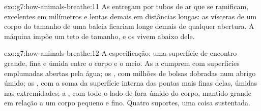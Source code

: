 \begin{solution}{exo:g7:how-animals-breathe:11}
As  entregam por tubos de ar que se ramificam, excelentes em
milímetros e lentas demais em distâncias longas: as vísceras de um
corpo do tamanho de uma baleia ficariam longe demais de qualquer
abertura. A máquina impõe um teto de tamanho, e os  vivem
abaixo dele.
\end{solution}

\begin{solution}{exo:g7:how-animals-breathe:12}
A especificação: uma superfície de encontro grande, fina e úmida entre
o corpo e o meio. As  a cumprem com superfícies emplumadas
abertas pela água; os , com milhões de bolsas dobradas num
abrigo úmido; as , com a soma da superfície interna das
pontas mais finas delas, úmidas nas extremidades; a , com todo o
lado de fora úmido do corpo, mantido grande em relação a um corpo
pequeno e fino. Quatro suportes, uma coisa sustentada.
\end{solution}

